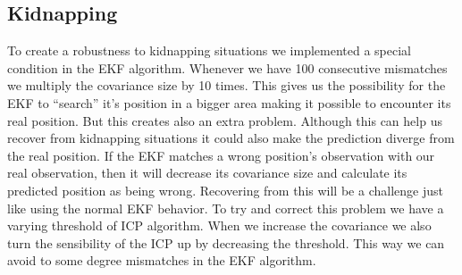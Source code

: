 \subsection{Kidnapping}
\label{subsec:Kidnapping}
To create a robustness to kidnapping situations we implemented a special condition in the EKF algorithm. Whenever we have 100 consecutive mismatches we multiply the covariance size by 10 times. This gives us the possibility for the EKF to “search” it’s position in a bigger area making it possible to encounter its real position. But this creates also an extra problem. Although this can help us recover from kidnapping situations it could also make the prediction diverge from the real position. If the EKF matches a wrong position’s observation with our real observation, then it will decrease its covariance size and calculate its predicted position as being wrong. Recovering from this will be a challenge just like using the normal EKF behavior. To try and correct this problem we have a varying threshold of ICP algorithm. When we increase the covariance we also turn the sensibility of the ICP up by decreasing the threshold. This way we can avoid to some degree mismatches in the EKF algorithm.

